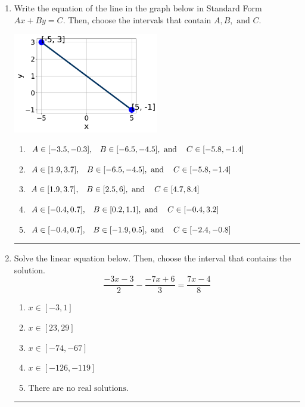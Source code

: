 \documentclass[14pt]{extbook}
\newcommand{\litem}[1]{\item#1\hspace*{-1cm}\rule{\textwidth}{0.4pt}}
\begin{document}
\begin{enumerate}
{\begin{enumerate}[label=\Alph*.]
\end{enumerate} }
\litem{
Write the equation of the line in the graph below in Standard Form $Ax+By=C$. Then, choose the intervals that contain $A, B, \text{ and } C$.
\begin{center}
    \includegraphics[width=0.5\textwidth]{../Figures/linearGraphToStandardCopyC.png}
\end{center}
\begin{enumerate}[label=\Alph*.]
\item \( A \in [-3.5, -0.3], \hspace{3mm} B \in [-6.5, -4.5], \text{ and } \hspace{3mm} C \in [-5.8, -1.4] \)
\item \( A \in [1.9, 3.7], \hspace{3mm} B \in [-6.5, -4.5], \text{ and } \hspace{3mm} C \in [-5.8, -1.4] \)
\item \( A \in [1.9, 3.7], \hspace{3mm} B \in [2.5, 6], \text{ and } \hspace{3mm} C \in [4.7, 8.4] \)
\item \( A \in [-0.4, 0.7], \hspace{3mm} B \in [0.2, 1.1], \text{ and } \hspace{3mm} C \in [-0.4, 3.2] \)
\item \( A \in [-0.4, 0.7], \hspace{3mm} B \in [-1.9, 0.5], \text{ and } \hspace{3mm} C \in [-2.4, -0.8] \)

\end{enumerate} }
\litem{
Solve the linear equation below. Then, choose the interval that contains the solution.\[ \frac{-3x -3}{2} - \frac{-7x + 6}{3} = \frac{7x -4}{8} \]\begin{enumerate}[label=\Alph*.]
\item \( x \in [-3, 1] \)
\item \( x \in [23, 29] \)
\item \( x \in [-74, -67] \)
\item \( x \in [-126, -119] \)
\item \( \text{There are no real solutions.} \)


\end{enumerate}}
\end{enumerate}
\end{document}
